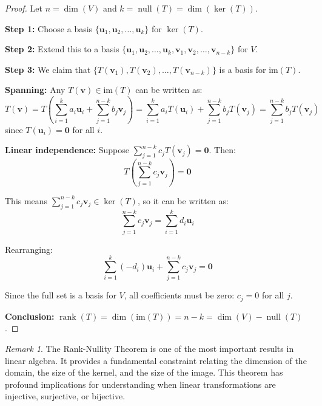 \documentclass[12pt]{article}
\numberwithin{equation}{section}
\newcommand{\vect}[1]{\boldsymbol{#1}}   %
\newcommand{\rank}{\operatorname{rank}}
\newcommand{\nullity}{\operatorname{null}}
\theoremstyle{plain}
\theoremstyle{definition}
\theoremstyle{remark}
\newtheorem{remark}[theorem]{Remark}
\begin{document}
\begin{proof}
Let $n = \dim(V)$ and $k = \nullity(T) = \dim(\ker(T))$.

\textbf{Step 1:} Choose a basis $\{\vect{u}_1, \vect{u}_2, \ldots, \vect{u}_k\}$ for $\ker(T)$.

\textbf{Step 2:} Extend this to a basis $\{\vect{u}_1, \vect{u}_2, \ldots, \vect{u}_k, \vect{v}_1, \vect{v}_2, \ldots, \vect{v}_{n-k}\}$ for $V$.

\textbf{Step 3:} We claim that $\{T(\vect{v}_1), T(\vect{v}_2), \ldots, T(\vect{v}_{n-k})\}$ is a basis for $\text{im}(T)$.

\textbf{Spanning:} Any $T(\vect{v}) \in \text{im}(T)$ can be written as:
$$T(\vect{v}) = T\left(\sum_{i=1}^k a_i\vect{u}_i + \sum_{j=1}^{n-k} b_j\vect{v}_j\right) = \sum_{i=1}^k a_iT(\vect{u}_i) + \sum_{j=1}^{n-k} b_jT(\vect{v}_j) = \sum_{j=1}^{n-k} b_jT(\vect{v}_j)$$
since $T(\vect{u}_i) = \vect{0}$ for all $i$.

\textbf{Linear independence:} Suppose $\sum_{j=1}^{n-k} c_jT(\vect{v}_j) = \vect{0}$. Then:
$$T\left(\sum_{j=1}^{n-k} c_j\vect{v}_j\right) = \vect{0}$$

This means $\sum_{j=1}^{n-k} c_j\vect{v}_j \in \ker(T)$, so it can be written as:
$$\sum_{j=1}^{n-k} c_j\vect{v}_j = \sum_{i=1}^k d_i\vect{u}_i$$

Rearranging:
$$\sum_{i=1}^k (-d_i)\vect{u}_i + \sum_{j=1}^{n-k} c_j\vect{v}_j = \vect{0}$$

Since the full set is a basis for $V$, all coefficients must be zero: $c_j = 0$ for all $j$.

\textbf{Conclusion:} $\rank(T) = \dim(\text{im}(T)) = n - k = \dim(V) - \nullity(T)$.
\end{proof}

\begin{remark}
The Rank-Nullity Theorem is one of the most important results in linear algebra. It provides a fundamental constraint relating the dimension of the domain, the size of the kernel, and the size of the image. This theorem has profound implications for understanding when linear transformations are injective, surjective, or bijective.
\end{remark}
\end{document}
